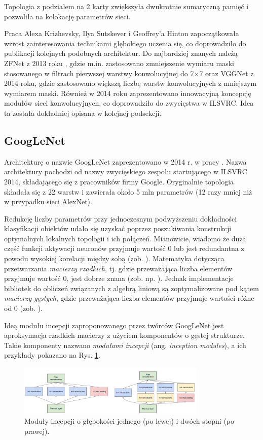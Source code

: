 Topologia z podziałem na 2 karty zwiększyła dwukrotnie sumaryczną pamięć i pozwoliła na kolokację parametrów sieci.

Praca Alexa Krizhevsky, Ilya Sutskever i Geoffrey'a Hinton zapoczątkowała wzrost zainteresowania technikami głębokiego uczenia się, co doprowadziło do publikacji kolejnych podobnych architektur. Do najbardziej znanych należą ZFNet z 2013 roku \cite{ZFNet}, gdzie m.in. zastosowano zmniejszenie wymiaru maski stosowanego w filtrach pierwszej warstwy konwolucyjnej do 7$\times$7 oraz VGGNet \cite{VGGNet} z 2014 roku, gdzie zastosowano większą liczbę warstw konwolucyjnych z mniejszym wymiarem maski. Również w 2014 roku zaprezentowano innowacyjną koncepcję modułów sieci konwolucyjnych, co doprowadziło do zwycięstwa w ILSVRC. Idea ta została dokładniej opisana w kolejnej podsekcji.

\subsection{GoogLeNet}
\label{googlenet}
Architekturę o nazwie GoogLeNet zaprezentowano w 2014 r. w pracy \cite{GoogleNet}. Nazwa architektury pochodzi od nazwy zwycięskiego zespołu startującego w ILSVRC 2014, składającego się z pracowników firmy Google. Oryginalnie topologia składała się z 22 warstw i zawierała około 5 mln parametrów (12 razy mniej niż w przypadku sieci AlexNet). 

Redukcję liczby parametrów przy jednoczesnym podwyższeniu dokładności klasyfikacji obiektów udało się uzyskać poprzez poszukiwania konstrukcji optymalnych lokalnych topologii i ich połączeń. Mianowicie, wiadomo że duża część funkcji aktywacji neuronów przyjmuje wartość 0 lub jest redundantna z powodu wysokiej korelacji między sobą (zob. \cite{DBLP:journals/corr/AroraBGM13}). Matematyka dotycząca przetwarzania \textit{macierzy rzadkich}, tj. gdzie przeważająca liczba elementów przyjmuje wartość 0, jest dobrze znana (zob. np. \cite{Umit2010}). Jednak implementacje bibliotek do obliczeń związanych z algebrą liniową są zoptymalizowane pod kątem \textit{macierzy gęstych}, gdzie przeważająca liczba elementów przyjmuje wartości różne od 0 (zob. \cite{Song:2014:SUM:2597652.2597670, Krizhevsky2012}). 

Ideą modułu incepcji zaproponowanego przez twórców GoogLeNet jest aproksymacja rzadkich macierzy z użyciem komponentów o gęstej strukturze. Takie komponenty nazwano \textit{modułami incepcji} (ang. \textit{inception modules}), a ich przykłady pokazano na Rys. \ref{GoogleNetInceptionModules}. 
\begin{figure}[h!]
	\centering
	\includegraphics[width=0.8\textwidth]{figures/InceptionModules.png}
	\caption{Moduły incepcji o głębokości jednego (po lewej) i dwóch stopni (po prawej).}
	\label{GoogleNetInceptionModules}
\end{figure}

